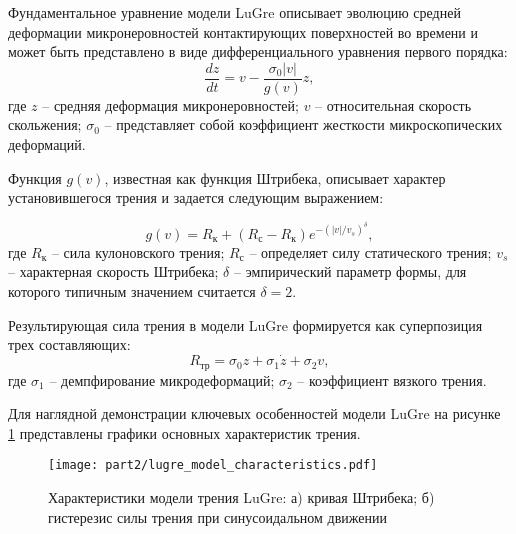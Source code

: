 Фундаментальное уравнение модели LuGre описывает эволюцию средней деформации
микронеровностей контактирующих поверхностей во времени и может быть представлено в виде дифференциального уравнения первого порядка:
\begin{equation}
	\label{eq:ch2/lugre}
	\frac{dz}{dt} = v - \frac{\sigma_0|v|}{g(v)}z,
\end{equation}
где $z$ -- средняя деформация микронеровностей;
$v$ -- относительная скорость скольжения;
$\sigma_0$ -- представляет собой коэффициент жесткости микроскопических деформаций.

Функция $g(v)$, известная как функция Штрибека, описывает характер установившегося трения и задается следующим выражением:

\begin{equation}
	\label{eq:ch2/stiction_function}
	g(v) = R_\text{к} + (R_\text{с} - R_\text{к})e^{-(|v|/v_s)^\delta},
\end{equation}
где $R_\text{к}$ -- сила кулоновского трения;
$R_\text{с}$ -- определяет силу статического трения;
$v_s$ -- характерная скорость Штрибека;
$\delta$ -- эмпирический параметр формы, для которого типичным значением считается $\delta = 2$.

Результирующая сила трения в модели LuGre формируется как суперпозиция трех составляющих:
\begin{equation}
	\label{eq:ch2/friction_force}
	R_\text{тр} = \sigma_0z + \sigma_1\dot{z} + \sigma_2v,
\end{equation}
где $\sigma_1$ -- демпфирование микродеформаций;
$\sigma_2$ -- коэффициент вязкого трения.

Для наглядной демонстрации ключевых особенностей модели LuGre на рисунке \ref{fig:lugre_characteristics} представлены графики основных характеристик трения.

\begin{figure}[ht]
	\centering
	\texttt{[image: part2/lugre\_model\_characteristics.pdf]}
	\caption{Характеристики модели трения LuGre: а) кривая Штрибека; б) гистерезис силы трения при синусоидальном движении}
	\label{fig:lugre_characteristics}
\end{figure}

